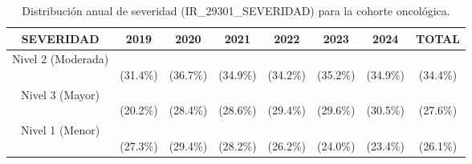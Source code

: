 \begin{table}[htbp]
\centering
\scriptsize
\setlength{\tabcolsep}{4pt}
\renewcommand{\arraystretch}{1.4}
\caption{Distribución anual de severidad (IR\_29301\_SEVERIDAD) para la cohorte oncológica.}
\label{tab:frecuencia_severidad_onco}
\begin{tabular}{|c|c|c|c|c|c|c|c|}
\hline
\parbox[t]{4.0cm}{\centering\textbf{SEVERIDAD}} & 
\parbox[t]{1.2cm}{\centering\textbf{2019}} & 
\parbox[t]{1.2cm}{\centering\textbf{2020}} & 
\parbox[t]{1.2cm}{\centering\textbf{2021}} & 
\parbox[t]{1.2cm}{\centering\textbf{2022}} & 
\parbox[t]{1.2cm}{\centering\textbf{2023}} & 
\parbox[t]{1.2cm}{\centering\textbf{2024}} & 
\parbox[t]{1.6cm}{\centering\textbf{TOTAL}} \\ \hline
\parbox[t]{4.0cm}{\raggedright Nivel 2 (Moderada)} & \parbox[t]{1.2cm}{\\(31.4\%)} & \parbox[t]{1.2cm}{\\(36.7\%)} & \parbox[t]{1.2cm}{\\(34.9\%)} & \parbox[t]{1.2cm}{\\(34.2\%)} & \parbox[t]{1.2cm}{\\(35.2\%)} & \parbox[t]{1.2cm}{\\(34.9\%)} & \parbox[t]{1.6cm}{\\(34.4\%)} \\ \hline
\parbox[t]{4.0cm}{\raggedright Nivel 3 (Mayor)} & \parbox[t]{1.2cm}{\\(20.2\%)} & \parbox[t]{1.2cm}{\\(28.4\%)} & \parbox[t]{1.2cm}{\\(28.6\%)} & \parbox[t]{1.2cm}{\\(29.4\%)} & \parbox[t]{1.2cm}{\\(29.6\%)} & \parbox[t]{1.2cm}{\\(30.5\%)} & \parbox[t]{1.6cm}{\\(27.6\%)} \\ \hline
\parbox[t]{4.0cm}{\raggedright Nivel 1 (Menor)} & \parbox[t]{1.2cm}{\\(27.3\%)} & \parbox[t]{1.2cm}{\\(29.4\%)} & \parbox[t]{1.2cm}{\\(28.2\%)} & \parbox[t]{1.2cm}{\\(26.2\%)} & \parbox[t]{1.2cm}{\\(24.0\%)} & \parbox[t]{1.2cm}{\\(23.4\%)} & \parbox[t]{1.6cm}{\\(26.1\%)} \\ \hline

\end{tabular}
\end{table}
